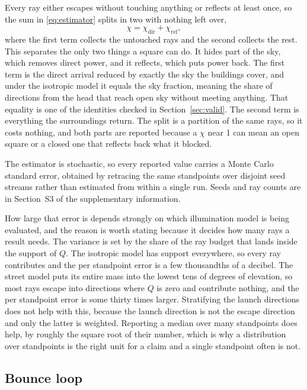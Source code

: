 Every ray either escapes without touching anything or reflects at least once, so
the sum in \eqref{eq:estimator} splits in two with nothing left over,
\begin{equation}
  \chi = \chi_{\mathrm{dir}} + \chi_{\mathrm{ref}} ,
  \label{eq:split}
\end{equation}
where the first term collects the untouched rays and the second collects the
rest. This separates the only two things a square can do. It hides part of the
sky, which removes direct power, and it reflects, which puts power back. The
first term is the direct arrival reduced by exactly the sky the buildings cover,
and under the isotropic model it equals the sky fraction, meaning the share of
directions from the head that reach open sky without meeting anything. That
equality is one of the identities checked in Section~\ref{sec:valid}. The second term is everything the
surroundings return. The split is a partition of the same rays, so it costs
nothing, and both parts are reported because a $\chi$ near 1 can mean an open
square or a closed one that reflects back what it blocked.

The estimator is stochastic, so every reported value carries a Monte Carlo
standard error, obtained by retracing the same standpoints over disjoint seed
streams rather than estimated from within a single run. Seeds and ray counts are
in Section~S3 of the supplementary information.

How large that error is depends strongly on which illumination model is being
evaluated, and the reason is worth stating because it decides how many rays a
result needs. The variance is set by the share of the ray budget that lands
inside the support of $Q$. The isotropic model has support everywhere, so every
ray contributes and the per standpoint error is a few thousandths of a decibel.
The street model puts its entire mass into the lowest tens of degrees of
elevation, so most rays escape into directions where $Q$ is zero and contribute
nothing, and the per standpoint error is some thirty times larger. Stratifying
the launch directions does not help with this, because the launch direction is
not the escape direction and only the latter is weighted. Reporting a median over
many standpoints does help, by roughly the square root of their number, which is
why a distribution over standpoints is the right unit for a claim and a single
standpoint often is not.

\subsection{Bounce loop}

